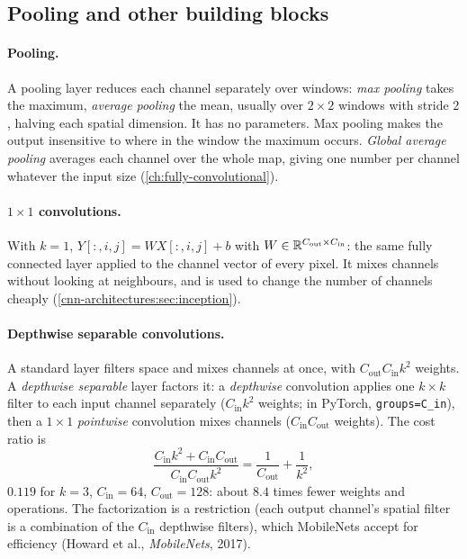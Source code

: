 \begin{notechapter}
\section{Pooling and other building blocks}\label{convolutional-layers:sec:blocks}

\paragraph{Pooling.} A pooling layer reduces each channel separately over windows: \emph{max
pooling} takes the maximum, \emph{average pooling} the mean, usually over $2\times2$ windows with stride
$2$, halving each spatial dimension. It has no parameters. Max pooling makes the output
insensitive to where in the window the maximum occurs. \emph{Global average pooling} averages
each channel over the whole map, giving one number per channel whatever the input size
(\cref{ch:fully-convolutional}).

\paragraph{$1\times1$ convolutions.} With $k = 1$, $Y[:,i,j] = WX[:,i,j] + b$ with $W\in\mathbb{R}^{C_{\mathrm{out}}\times C_{\mathrm{in}}}$: the same fully connected
layer applied to the channel vector of every pixel. It mixes channels without looking at
neighbours, and is used to change the number of channels cheaply
(\cref{cnn-architectures:sec:inception}).

\paragraph{Depthwise separable convolutions.} A standard layer filters space and mixes
channels at once, with $C_{\mathrm{out}}C_{\mathrm{in}}k^2$ weights. A \emph{depthwise separable} layer factors it: a
\emph{depthwise} convolution applies one $k\times k$ filter to each input channel separately ($C_{\mathrm{in}}k^2$ weights; in
PyTorch, \texttt{groups=C\_in}), then a $1\times1$ \emph{pointwise} convolution mixes channels ($C_{\mathrm{in}}C_{\mathrm{out}}$ weights). The cost
ratio is
\[
  \frac{C_{\mathrm{in}}k^2 + C_{\mathrm{in}}C_{\mathrm{out}}}{C_{\mathrm{in}}C_{\mathrm{out}}k^2} = \frac1{C_{\mathrm{out}}} + \frac1{k^2},
\]
$0.119$ for $k = 3$, $C_{\mathrm{in}} = 64$, $C_{\mathrm{out}} = 128$: about $8.4$ times fewer weights and operations. The factorization is
a restriction (each output channel's spatial filter is a combination of the $C_{\mathrm{in}}$ depthwise filters),
which MobileNets accept for efficiency (Howard et al., \emph{MobileNets}, 2017).


\end{notechapter}
